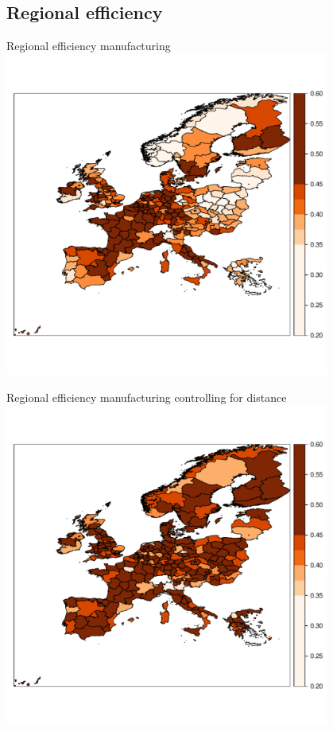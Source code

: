 \documentclass[ignorenonframetext]{beamer}
\begin{document}
\subsection{Regional efficiency}

\begin{frame}{Regional efficiency manufacturing}
\includegraphics[width=0.8\textwidth]{TEfrontier}
\end{frame}

\begin{frame}{Regional efficiency manufacturing controlling for distance}
\includegraphics[width=0.8\textwidth]{TEfrontierError}
\end{frame}
\end{document}
